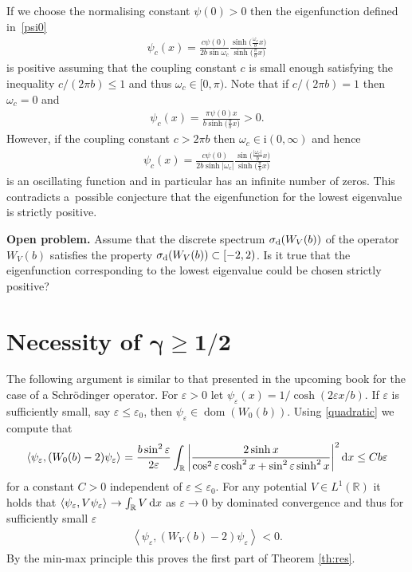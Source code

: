 \documentclass[pdftex]{sigma}%
\numberwithin{equation}{section}
\newcommand{\eps}{\varepsilon}
\newcommand{\ii}{\mathrm{i}}
\newcommand{\R}{\mathbb{R}}
\newcommand{\sclp}[2][]{{\left\langle#2\right\rangle} _{#1}}
\DeclareMathOperator{\dom}{dom}
\begin{document}
\begin{Remark}If we choose the normalising constant $\psi(0) >0$ then the eigenfunction defined in~\eqref{psi0}
\begin{gather*}
\psi_c(x)
=\frac{c\psi(0)}{2b\sin\omega_c}\frac{\sinh\big(\frac{\omega_c}{b}x\big)}{\sinh\big(\frac{\pi}{b}x\big)}
\end{gather*}
is positive assuming that the coupling constant $c$ is small enough satisfying the inequality $c/(2\pi b)\le1$ and thus $\omega_c \in[0,\pi)$. Note that if $c/(2\pi b) = 1$ then $\omega_c = 0$ and
\begin{gather*}
\psi_c(x) = \frac{\pi \psi(0) x}{b \sinh\big(\frac{\pi}{b}x\big)}>0.
\end{gather*}
However, if the coupling constant $c> 2\pi b$ then $\omega_c \in \ii(0,\infty)$ and hence
\begin{gather*}
\psi_c(x)=\frac{c\psi(0)}{2b\sinh|\omega_c|}\frac{\sin\big(\frac{|\omega_c|}{b}x\big)}{\sinh\big(\frac{\pi}{b}x\big)}
\end{gather*}
is an oscillating function and in particular has an infinite number of zeros. This contradicts a~possible conjecture that the eigenfunction for the lowest eigenvalue is strictly positive.
\end{Remark}

\noindent
{\bf Open problem.} Assume that the discrete spectrum $\sigma_{\rm d}(W_V(b))$ of the operator $W_V(b)$ satisfies the property $\sigma_{\rm d}(W_V(b))\subset [-2,2)$. Is it true that the eigenfunction corresponding to the lowest eigenvalue could be chosen strictly positive?

\section[Necessity of gamma >= 1/2]
{Necessity of $\boldsymbol{\gamma\ge1/2}$}

The following argument is similar to that presented in the upcoming book \cite[Propositions~4.41 and~4.42]{FLW} for the case of a Schr\"odinger operator.
For $\eps>0$ let $\psi_\eps(x)=1/\cosh(2\eps x/b)$. If $\eps$ is sufficiently small, say $\eps\le\eps_0$, then $\psi_\eps\in \dom(W_0(b))$. Using \eqref{quadratic} we compute that
\begin{gather}
\sclp{\psi_\eps,(W_0(b)-2)\psi_\eps}
=\frac{b\sin^2\eps}{2\eps}\int_{\R}\bigg|\frac{2\sinh x}{\cos^2\eps\cosh^2x+\sin^2\eps\sinh^2 x}\bigg|^2\, {\rm d} x
\le Cb\eps\label{Weps}
\end{gather}
for a constant $C>0$ independent of $\eps\le\eps_0$. For any potential $V\in L^1(\R)$ it holds that $\sclp{\psi_\eps,V\psi_\eps}\to\int_{\R}V\, {\rm d} x$ as $\eps\to0$ by dominated convergence and thus for sufficiently small $\eps$
\begin{gather*}
\sclp{\psi_\eps,(W_V(b)-2)\psi_\eps}<0.
\end{gather*}
By the min-max principle this proves the first part of Theorem \ref{th:res}.
\end{document}
